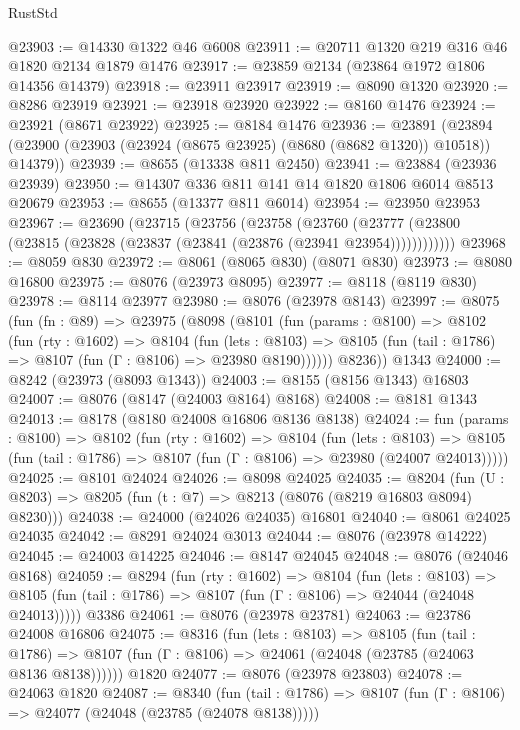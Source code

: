\begin{lexlean}{RustStd}
\begin{coremodule}
@23903 := @14330 @1322 @46 @6008
@23911 := @20711 @1320 @219 @316 @46 @1820 @2134 @1879 @1476
@23917 := @23859 @2134 (@23864 @1972 @1806 @14356 @14379)
@23918 := @23911 @23917
@23919 := @8090 @1320
@23920 := @8286 @23919
@23921 := @23918 @23920
@23922 := @8160 @1476
@23924 := @23921 (@8671 @23922)
@23925 := @8184 @1476
@23936 := @23891
    (@23894 (@23900 (@23903 (@23924 (@8675 @23925) (@8680 (@8682 @1320)) @10518)) @14379))
@23939 := @8655 (@13338 @811 @2450)
@23941 := @23884 (@23936 @23939)
@23950 := @14307 @336 @811 @141 @14 @1820 @1806 @6014 @8513 @20679
@23953 := @8655 (@13377 @811 @6014)
@23954 := @23950 @23953
@23967 := @23690
    (@23715
      (@23756
        (@23758
          (@23760 (@23777 (@23800 (@23815 (@23828 (@23837 (@23841 (@23876 (@23941 @23954))))))))))))
@23968 := @8059 @830
@23972 := @8061 (@8065 @830) (@8071 @830)
@23973 := @8080 @16800
@23975 := @8076 (@23973 @8095)
@23977 := @8118 (@8119 @830)
@23978 := @8114 @23977
@23980 := @8076 (@23978 @8143)
@23997 := @8075
    (fun (fn : @89) =>
    @23975
      (@8098
        (@8101
          (fun (params : @8100) =>
          @8102
            (fun (rty : @1602) =>
            @8104
              (fun (lets : @8103) =>
              @8105 (fun (tail : @1786) => @8107 (fun (Γ : @8106) => @23980 @8190))))))
        @8236))
    @1343
@24000 := @8242 (@23973 (@8093 @1343))
@24003 := @8155 (@8156 @1343) @16803
@24007 := @8076 (@8147 (@24003 @8164) @8168)
@24008 := @8181 @1343
@24013 := @8178 (@8180 @24008 @16806 @8136 @8138)
@24024 := fun (params : @8100) =>
  @8102
    (fun (rty : @1602) =>
    @8104
      (fun (lets : @8103) =>
      @8105 (fun (tail : @1786) => @8107 (fun (Γ : @8106) => @23980 (@24007 @24013)))))
@24025 := @8101 @24024
@24026 := @8098 @24025
@24035 := @8204
    (fun (U : @8203) => @8205 (fun (t : @7) => @8213 (@8076 (@8219 @16803 @8094) @8230)))
@24038 := @24000 (@24026 @24035) @16801
@24040 := @8061 @24025 @24035
@24042 := @8291 @24024 @3013
@24044 := @8076 (@23978 @14222)
@24045 := @24003 @14225
@24046 := @8147 @24045
@24048 := @8076 (@24046 @8168)
@24059 := @8294
    (fun (rty : @1602) =>
    @8104
      (fun (lets : @8103) =>
      @8105 (fun (tail : @1786) => @8107 (fun (Γ : @8106) => @24044 (@24048 @24013)))))
    @3386
@24061 := @8076 (@23978 @23781)
@24063 := @23786 @24008 @16806
@24075 := @8316
    (fun (lets : @8103) =>
    @8105
      (fun (tail : @1786) =>
      @8107 (fun (Γ : @8106) => @24061 (@24048 (@23785 (@24063 @8136 @8138))))))
    @1820
@24077 := @8076 (@23978 @23803)
@24078 := @24063 @1820
@24087 := @8340
    (fun (tail : @1786) => @8107 (fun (Γ : @8106) => @24077 (@24048 (@23785 (@24078 @8138)))))

\end{coremodule}
\end{lexlean}
